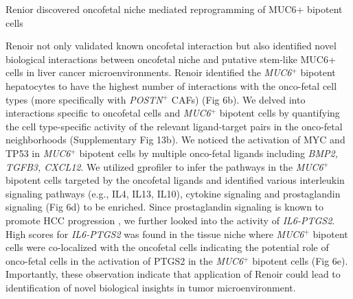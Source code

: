 Renior discovered oncofetal niche mediated reprogramming of MUC6+ bipotent cells

Renoir not only validated known oncofetal interaction but also identified novel biological interactions between oncofetal niche and putative stem-like MUC6+ cells in liver cancer microenvironments. Renoir identified the \textit{MUC6}$^{+}$ bipotent hepatocytes to have the highest number of interactions with the onco-fetal cell types (more specifically with \textit{POSTN}$^{+}$ CAFs) (Fig 6b). We delved into interactions specific to oncofetal cells and \textit{MUC6}$^{+}$ bipotent cells by quantifying the cell type-specific activity of the relevant ligand-target pairs in the onco-fetal neighborhoods (Supplementary Fig 13b). We noticed the activation of MYC and TP53 in \textit{MUC6}$^{+}$ bipotent cells by multiple onco-fetal ligands including \textit{BMP2, TGFB3, CXCL12}. We utilized gprofiler \citep{gProfiler} to infer the  pathways in the \textit{MUC6}$^{+}$ bipotent cells targeted by the oncofetal ligands and identified various interleukin signaling pathways (e.g., IL4, IL13, IL10), cytokine signaling and prostaglandin signaling (Fig 6d) to be enriched. Since prostaglandin signaling is known to promote HCC progression \citep{prostaglandin_pathway}, we further looked into the activity of \textit{IL6-PTGS2}. High scores for \textit{IL6-PTGS2} was found in the tissue niche where \textit{MUC6}$^{+}$ bipotent cells were co-localized with the oncofetal cells indicating the potential role of onco-fetal cells in the activation of PTGS2 in the \textit{MUC6}$^{+}$ bipotent cells (Fig 6e). Importantly, these observation indicate that application of Renoir could lead to identification of novel biological insights in tumor microenvironment. 